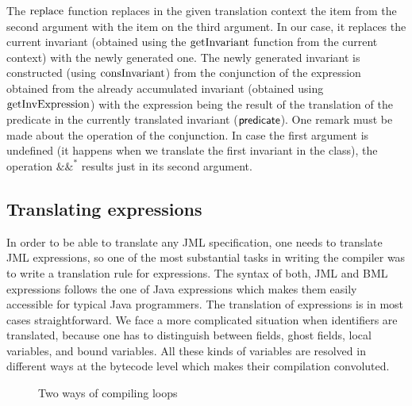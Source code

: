\documentclass{llncs}
\begin{document}
The $\mathrm{replace}$ function replaces in the given translation context the
item from the second argument with the item on the third argument. In
our case, it replaces the current invariant (obtained using the
$\mathrm{getInvariant}$ function from the current context) with the newly
generated one. The newly generated invariant is constructed (using
$\mathrm{consInvariant}$) from the conjunction of the expression obtained from
the already accumulated invariant (obtained using $\mathrm{getInvExpression}$)
with the expression being the result of the translation of the
predicate in the currently translated invariant ($\mathsf{predicate}$). One
remark must be made about the operation of the conjunction. In case
the first argument is undefined (it happens when we translate the
first invariant in the class), the operation $\&\&^*$ results just in
its second argument.

\subsection{Translating expressions}
In order to be able to translate any JML specification, one needs to
translate JML expressions, so one of the most substantial tasks in
writing the compiler was to write a translation rule for
expressions. The syntax of both, JML and BML expressions follows the one of Java
expressions which makes them easily accessible for typical Java
programmers. The translation of expressions
is in most cases straightforward. We face a more complicated situation
when identifiers are translated, because one has to distinguish
between fields, ghost fields, local variables, and bound
variables. All these kinds of variables are resolved in different ways
at the bytecode level which makes their compilation convoluted.

\begin{figure}[ht]
\caption{Two ways of compiling loops}
\label{fig:loops}
\end{figure}
\end{document}
